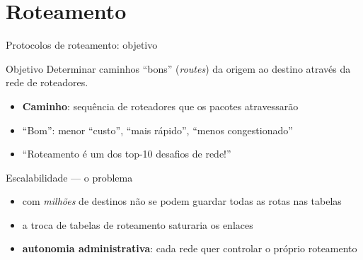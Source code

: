 \documentclass[aspectratio=169,11pt]{beamer}
\begin{document}
\section{Roteamento}

\begin{frame}{Protocolos de roteamento: objetivo}
  \begin{block}{Objetivo}
    Determinar caminhos ``bons'' (\emph{routes}) da origem ao destino através da rede de roteadores.
  \end{block}
  \begin{itemize}
    \item \textbf{Caminho}: sequência de roteadores que os pacotes atravessarão
    \item ``Bom'': menor ``custo'', ``mais rápido'', ``menos congestionado''
    \item \alert{``Roteamento é um dos top-10 desafios de rede!''}
  \end{itemize}
  \begin{exampleblock}{Escalabilidade --- o problema}
    \begin{itemize}
      \item com \emph{milhões} de destinos não se podem guardar todas as rotas nas tabelas
      \item a troca de tabelas de roteamento saturaria os enlaces
      \item \textbf{autonomia administrativa}: cada rede quer controlar o próprio roteamento
    \end{itemize}
  \end{exampleblock}
\end{frame}
\end{document}
